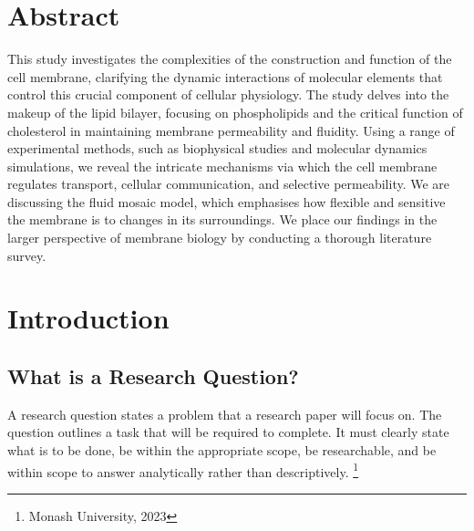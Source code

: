 \documentclass[a4paper,12pt,twoside,english]{all-in-one} %
\author{Author \\ \texttt{Samim Khaleqi}}
\begin{document}
\setlength{\baselineskip}{.70cm}

\begin{titlepage}
\maketitle\vfill
\doclicenseThis
\thispagestyle{empty}
\end{titlepage}

\thispagestyle{plain}
\tableofcontents
\newpage

\pagestyle{\defaultsettings}

\section{Abstract}
This study investigates the complexities of the construction and function of the cell membrane, clarifying the dynamic interactions of molecular elements that control this crucial component of cellular physiology. The study delves into the makeup of the lipid bilayer, focusing on phospholipids and the critical function of cholesterol in maintaining membrane permeability and fluidity. Using a range of experimental methods, such as biophysical studies and molecular dynamics simulations, we reveal the intricate mechanisms via which the cell membrane regulates transport, cellular communication, and selective permeability. We are discussing the fluid mosaic model, which emphasises how flexible and sensitive the membrane is to changes in its surroundings. We place our findings in the larger perspective of membrane biology by conducting a thorough literature survey.

\section{Introduction}
\subsection{What is a Research Question?}
A research question states a problem that a research paper will focus on. The question outlines a task that will be required to complete. It must clearly state what is to be done, be within the appropriate scope, be researchable, and be within scope to answer analytically rather than descriptively. \footnote{Monash University, 2023}
\end{document}
